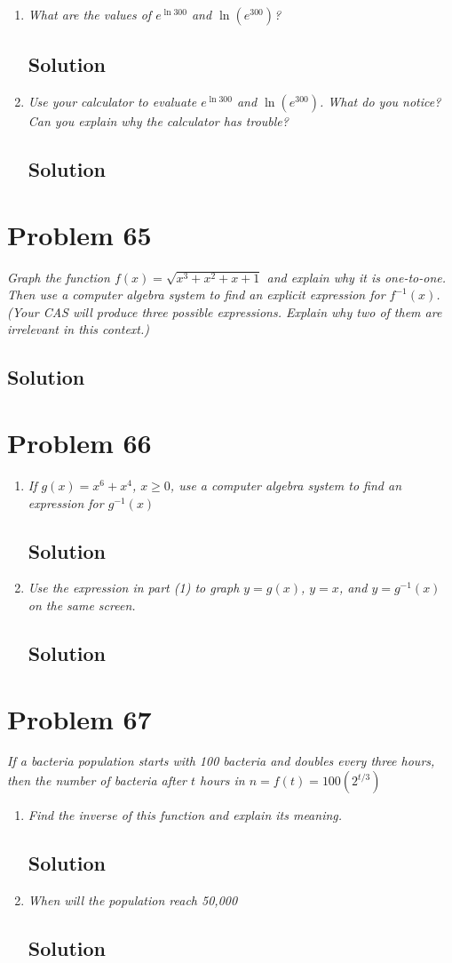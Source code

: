 \documentclass[11pt]{article}
\newcommand{\soln}{\subsection*}
\newcommand{\qn}{\textit}
\begin{document}
\begin{enumerate}
	\item \qn{What are the values of $e^{\ln{300}}$ and $\ln(e^300)$?}
	\soln{Solution}
	
	\item \qn{Use your calculator to evaluate $e^{\ln{300}}$ and $\ln(e^{300})$. What do you notice? Can you explain why the calculator has trouble?}
	\soln{Solution}
\end{enumerate}

\section*{Problem 65}

\qn{Graph the function $f(x)=\sqrt{x^3+x^2+x+1}$ and explain why it is one-to-one. Then use a computer algebra system to find an explicit expression for $f^{-1}(x)$. (Your CAS will produce three possible expressions. Explain why two of them are irrelevant in this context.)}

\soln{Solution}

\section*{Problem 66}

\begin{enumerate}
	\item \qn{If $g(x)=x^6+x^4$, $x \ge 0$, use a computer algebra system to find an expression for $g^{-1}(x)$}
	\soln{Solution}
	
	\item \qn{Use the expression in part (1) to graph $y=g(x)$, $y=x$, and $y=g^{-1}(x)$ on the same screen.}
	\soln{Solution}
\end{enumerate}

\section*{Problem 67}

\qn{If a bacteria population starts with 100 bacteria and doubles every three hours, then the number of bacteria after $t$ hours in $n=f(t)=100(2^{t/3})$}
\begin{enumerate}
	\item \qn{Find the inverse of this function and explain its meaning.}
	\soln{Solution}
	
	\item \qn{When will the population reach 50,000}
	\soln{Solution}
\end{enumerate}
\end{document}
